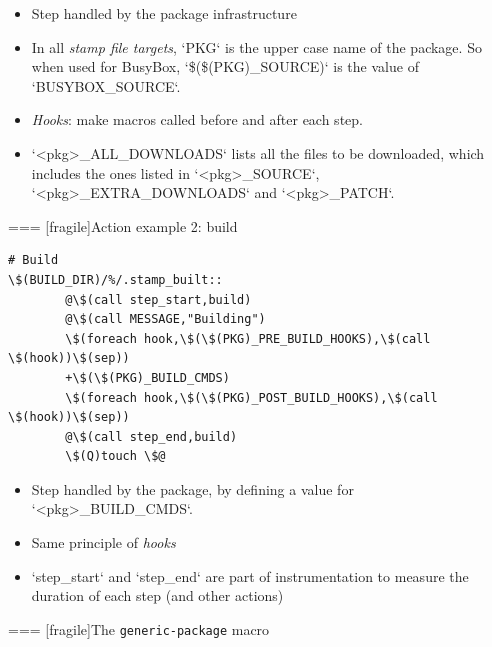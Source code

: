 \begin{itemize}
\item Step handled by the package infrastructure
\item In all {\em stamp file targets}, `PKG` is the upper case
  name of the package. So when used for BusyBox,
  `\$(\$(PKG)_SOURCE)` is the value of `BUSYBOX_SOURCE`.
\item {\em Hooks}: make macros called before and after each step.
\item `<pkg>_ALL_DOWNLOADS` lists all the files to be downloaded,
  which includes the ones listed in `<pkg>_SOURCE`,
  `<pkg>_EXTRA_DOWNLOADS` and `<pkg>_PATCH`.
\end{itemize}



=== [fragile]{Action example 2: build}

\begin{block}{}
\begin{verbatim}
# Build
\$(BUILD_DIR)/%/.stamp_built::
        @\$(call step_start,build)
        @\$(call MESSAGE,"Building")
        \$(foreach hook,\$(\$(PKG)_PRE_BUILD_HOOKS),\$(call \$(hook))\$(sep))
        +\$(\$(PKG)_BUILD_CMDS)
        \$(foreach hook,\$(\$(PKG)_POST_BUILD_HOOKS),\$(call \$(hook))\$(sep))
        @\$(call step_end,build)
        \$(Q)touch \$@
\end{verbatim}
\end{block}

\begin{itemize}
\item Step handled by the package, by defining a value for
  `<pkg>_BUILD_CMDS`.
\item Same principle of {\em hooks}
\item `step_start` and `step_end` are part of
  instrumentation to measure the duration of each step (and other
  actions)
\end{itemize}



=== [fragile]{The {\tt generic-package} macro}

